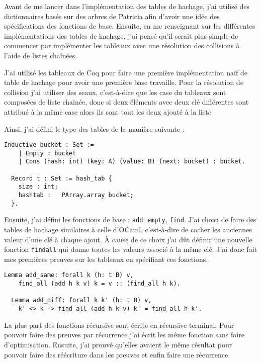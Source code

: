 \documentclass{article}
\begin{document}
  Avant de me lancer dans l'implémentation des tables de hachage, j'ai
utilisé des dictionnaires basés sur des arbres de Patricia afin d'avoir une idée
des spécifications des fonctions de base. Ensuite, en me renseignant sur les
différentes implémentations des tables de hachage, j'ai pensé qu'il serait
plus simple de commencer par implémenter les tableaux avec une résolution des
collisions à l'aide de listes chaînées.

  J'ai utilisé les tableaux de Coq pour faire une première implémentation naïf
de table de hachage pour avoir une première base travaille. Pour la résolution
de collision j'ai utiliser des seaux, c'est-à-dire que les case du tableaux sont
composées de liste chainée, donc si deux éléments avec deux clé différentes sont
attribué à la même case alors ils sont tout les deux ajouté à la liste

Ainsi, j'ai défini le type des tables de la manière suivante :

\begin{lstlisting}[language=Coq]
  Inductive bucket : Set :=
    | Empty : bucket
    | Cons (hash: int) (key: A) (value: B) (next: bucket) : bucket.

  Record t : Set := hash_tab {
    size : int;
    hashtab :   PArray.array bucket;
  }.
\end{lstlisting}

  Ensuite, j'ai défini les fonctions de base : \texttt{add}, \texttt{empty},
\texttt{find}. J'ai choisi de faire des tables de hachage similaires à celle
d'OCaml, c'est-à-dire de cacher les anciennes valeur d'une clé à chaque ajout.
\`A cause de ce choix j'ai dût définir une nouvelle fonction \texttt{findall} qui
donne toutes les valeurs associé à la même clé. J'ai donc fait mes premières
preuves sur les tableaux en spécifiant ces fonctions.

\begin{lstlisting}[language=Coq]
  Lemma add_same: forall k (h: t B) v,
    find_all (add h k v) k = v :: (find_all h k).

  Lemma add_diff: forall k k' (h: t B) v,
    k' <> k -> find_all (add h k v) k' = find_all h k'.
\end{lstlisting}

  La plus part des fonctions récursive sont écrite en récursive terminal. Pour
pouvoir faire des preuves par récurrence j'ai écrit les même fonction sans faire
d'optimisation. Ensuite, j'ai prouvé qu'elles avaient le même résultat pour
pouvoir faire des réécriture dans les preuves et enfin faire une récurrence.
\end{document}
